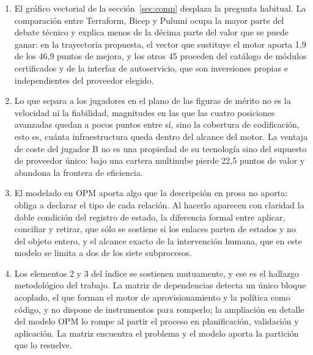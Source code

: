 \documentclass[11pt,letterpaper]{article}
\begin{document}
\begin{enumerate}
    observabilidad, política y pruebas, sustitución del motor y, en último
    lugar, interfaz de autoservicio. Convierte además en constatación
    estructural lo que la sección~\ref{sec:comp} defiende como criterio: el
    catálogo antes que el motor no es una preferencia sino la única
    ordenación que no fuerza una iteración.
  \item El gráfico vectorial de la sección~\ref{sec:comp} desplaza la
    pregunta habitual.
    La comparación entre Terraform, Bicep y Pulumi ocupa la mayor parte del
    debate técnico y explica menos de la décima parte del valor que se puede
    ganar: en la trayectoria propuesta, el vector que sustituye el motor
    aporta 1,9 de los 46,9 puntos de mejora, y los otros 45 proceden del
    catálogo de módulos certificados y de la interfaz de autoservicio, que son
    inversiones propias e independientes del proveedor elegido.
  \item Lo que separa a los jugadores en el plano de las figuras de mérito no
    es la velocidad ni la fiabilidad, magnitudes en las que las cuatro
    posiciones avanzadas quedan a pocos puntos entre sí, sino la cobertura de
    codificación, esto es, cuánta infraestructura queda dentro del alcance del
    motor. La ventaja de coste del jugador B no es una propiedad de su
    tecnología sino del supuesto de proveedor único: bajo una cartera
    multinube pierde 22,5 puntos de valor y abandona la frontera de
    eficiencia.
  \item El modelado en OPM aporta algo que la descripción en prosa no aporta:
    obliga a declarar el tipo de cada relación. Al hacerlo aparecen con
    claridad la doble condición del registro de estado, la diferencia formal
    entre aplicar, conciliar y retirar, que sólo se sostiene si los enlaces
    parten de estados y no del objeto entero, y el alcance exacto de la
    intervención humana, que en este modelo se limita a dos de los siete
    subprocesos.
  \item Los elementos 2 y 3 del índice se sostienen mutuamente, y ese es el
    hallazgo metodológico del trabajo. La matriz de dependencias detecta un
    único bloque acoplado, el que forman el motor de aprovisionamiento y la
    política como código, y no dispone de instrumentos para romperlo; la
    ampliación en detalle del modelo OPM lo rompe al partir el proceso en
    planificación, validación y aplicación. La matriz encuentra el problema y
    el modelo aporta la partición que lo resuelve.
\end{enumerate}

\printbibliography[heading=bibintoc,title={Referencias bibliográficas}]
\end{document}
